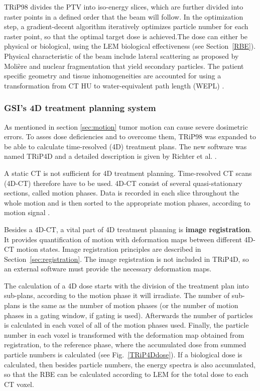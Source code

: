 TRiP98 divides the PTV into iso-energy slices, which are further divided into raster points in a defined order that the beam will follow. In the optimization step, a gradient-decent algorithm iteratively optimizes particle number
for each raster point, so that the optimal target dose is achieved.The dose can either be physical or biological, using the LEM biological effectiveness (see Section~\ref{RBE}).
Physical characteristic of the beam include lateral scattering as proposed by Moli\`ere \cite{Moliere1948} and nuclear fragmentation that yield secondary particles. The patient specific
geometry and tissue inhomogeneities are accounted for using a transformation from CT HU to water-equivalent path length (WEPL) \cite{Geiss1999,Jaekel2001,Rietzel2007}.


\subsubsection{GSI's 4D treatment planning system}

As mentioned in section \ref{sec:motion} tumor motion can cause severe dosimetric errors. To asses dose deficiencies and to overcome them, TRiP98 was expanded to be able to calculate time-resolved (4D) treatment plans. The new software was named TRiP4D and a detailed description is given by Richter et al. \cite{Richter2013}.

A static CT is not sufficient for 4D treatment planning. Time-resolved CT scans (4D-CT) therefore have to be used. 4D-CT consist of several quasi-stationary sections, called motion phases. Data is
recorded in each slice throughout the whole motion and is then sorted to the appropriate motion phases, according to motion signal \cite{Rietzel2005}.

Besides a 4D-CT, a vital part of 4D treatment planning is \textbf{image registration}. It provides quantification of motion with deformation maps between different 4D-CT motion states. Image registration principles are described in Section~\ref{sec:registration}. The image registration is not included in TRiP4D, so an external software must provide the necessary
deformation maps.

The calculation of a 4D dose starts with the division of the treatment plan into sub-plans, according to the motion phase it will irradiate. The number of sub-plans is the same as the number of motion phases (or the number of motion phases
in a gating window, if gating is used). Afterwards the number of particles is calculated in each voxel of all of the motion phases used. Finally, the particle number in each voxel is transformed with the deformation map
obtained from registration, to the reference phase, where the accumulated dose from summed particle numbers is calculated (see Fig.~\ref{TRiP4Ddose}). If a biological dose is calculated, then besides particle numbers, the energy spectra is also accumulated, 
so that the RBE can be calculated according to LEM for the total dose to each CT voxel.

